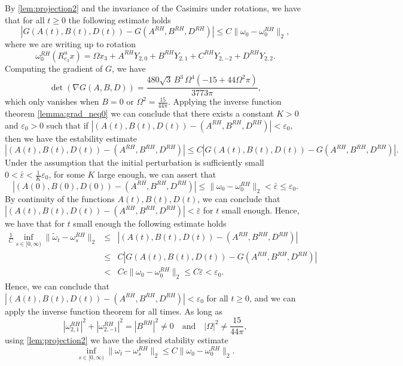 \documentclass{amsart}
\def\eps{{\varepsilon}}
\begin{document}
By \cref{lem:projection2} and the invariance of the Casimirs under rotations, we have that for all $t\geq0$ the following estimate holds
\begin{equation}
    |G(A(t),B(t),D(t))-G(A^{RH},B^{RH},D^{RH})|\leq C\|\omega_0-\omega^{RH}_0\|_2,
    \label{eq:final_Ck}
\end{equation}
where we are writing up to rotation
$$
\omega_0^{RH}(R^u_{e_3}x)=\Omega x_3 + A^{RH} Y_{2,0} + B^{RH} Y_{2,1} + C^{RH} Y_{2,-2} + D^{RH} Y_{2,2}.
$$
Computing the gradient of $G$, we have 
\begin{equation*}
    \det(\nabla G(A,B,D)) = \frac{480 \sqrt{3} \, B^3 \, \Omega^4 \left(-15 + 44 \Omega^2 \pi\right)}{3773 \pi},
\end{equation*}
which only vanishes when $B=0$ or $\Omega^2=\frac{15}{44\pi}$. Applying the inverse function theorem \cref{lemma:grad_neq0} we can conclude that there exists a constant $K>0$ and $\eps_0>0$ such that if $|(A(t),B(t),D(t))-(A^{RH},B^{RH},D^{RH})|<\eps_0$, then we have the estability estimate
\begin{equation*}
    |(A(t),B(t),D(t))-(A^{RH},B^{RH},D^{RH})|\leq C|G(A(t),B(t),D(t))-G(A^{RH},B^{RH},D^{RH})|.
\end{equation*}
Under the assumption that the initial perturbation is sufficiently small $0<\bar\eps<\frac{1}{K}\eps_0$, for some $K$ large enough, we can assert that
\begin{equation*}
|(A(0),B(0),D(0))-(A^{RH},B^{RH},D^{RH})|\le \|\omega_0-\omega_0^{RH}\|_2<\bar\eps\le \eps_0.
\end{equation*}
By continuity of the functions $A(t),B(t),D(t)$, we can conclude that $|(A(t),B(t),D(t))-(A^{RH},B^{RH},D^{RH})|<\bar\eps$ for $t$ small enough. Hence, we have that for $t$ small enough the following estimate holds
\begin{eqnarray*}
    \frac{1}{C}\inf_{s\in[0,\infty)}\|\tilde\omega_t-\omega^{RH}_s \|_2
    &\leq& |(A(t),B(t),D(t))-(A^{RH},B^{RH},D^{RH})|\\
    &\leq& C|G(A(t),B(t),D(t))-G(A^{RH},B^{RH},D^{RH})|\\
    &<& C c \|\omega_0 - \omega_0^{RH}\|_2\le C \bar\eps<\eps_0.
\end{eqnarray*}
Hence, we can conclude that $|(A(t),B(t),D(t))-(A^{RH},B^{RH},D^{RH})|<\eps_0$ for all $t\geq0$, and we can apply the inverse function theorem for all times. As long as
$$|\omega^{RH}_{2,1}|^2+|\omega^{RH}_{2,-1}|^2=|B^{RH}|^2\neq0\quad\text{and}\quad |\Omega|^2\neq \frac{15}{44\pi},$$
using \cref{lem:projection2} we have the desired stability estimate
\begin{equation*}
    \inf_{s\in[0,\infty)}\|\omega_t-\omega^{RH}_s\|_2\leq C\|\omega_0 - \omega_0^{RH}\|_2 .
\end{equation*}
\end{document}
